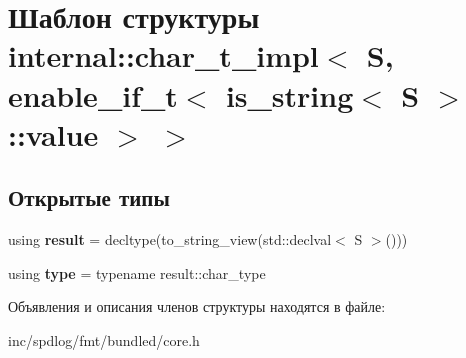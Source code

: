 \hypertarget{structinternal_1_1char__t__impl_3_01S_00_01enable__if__t_3_01is__string_3_01S_01_4_1_1value_01_4_01_4}{}\section{Шаблон структуры internal\+:\+:char\+\_\+t\+\_\+impl$<$ S, enable\+\_\+if\+\_\+t$<$ is\+\_\+string$<$ S $>$\+:\+:value $>$ $>$}
\label{structinternal_1_1char__t__impl_3_01S_00_01enable__if__t_3_01is__string_3_01S_01_4_1_1value_01_4_01_4}
\subsection*{Открытые типы}
\begin{DoxyCompactItemize}
\item 
\mbox{\label{structinternal_1_1char__t__impl_3_01S_00_01enable__if__t_3_01is__string_3_01S_01_4_1_1value_01_4_01_4_ae81cac0f5eaecb78283bcd5fe5e63c8a}} 
using {\bfseries result} = decltype(to\+\_\+string\+\_\+view(std\+::declval$<$ S $>$()))
\item 
\mbox{\label{structinternal_1_1char__t__impl_3_01S_00_01enable__if__t_3_01is__string_3_01S_01_4_1_1value_01_4_01_4_ac9c01ee529f8a9ee4e7c50ae2e6e3343}} 
using {\bfseries type} = typename result\+::char\+\_\+type
\end{DoxyCompactItemize}


Объявления и описания членов структуры находятся в файле\+:\begin{DoxyCompactItemize}
\item 
inc/spdlog/fmt/bundled/core.\+h\end{DoxyCompactItemize}
